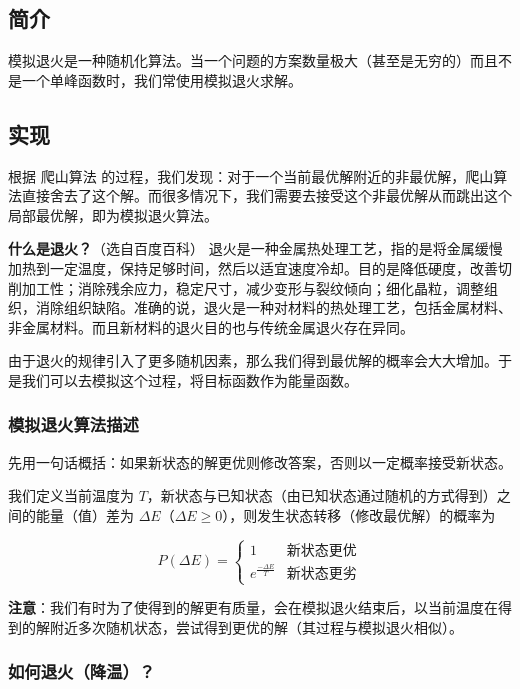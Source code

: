 
\subsection{简介}

模拟退火是一种随机化算法。当一个问题的方案数量极大（甚至是无穷的）而且不是一个单峰函数时，我们常使用模拟退火求解。

\hr

\subsection{实现}

根据  爬山算法  的过程，我们发现：对于一个当前最优解附近的非最优解，爬山算法直接舍去了这个解。而很多情况下，我们需要去接受这个非最优解从而跳出这个局部最优解，即为模拟退火算法。

\begin{QUOTE}{}{}
\textbf{什么是退火？}（选自百度百科）
退火是一种金属热处理工艺，指的是将金属缓慢加热到一定温度，保持足够时间，然后以适宜速度冷却。目的是降低硬度，改善切削加工性；消除残余应力，稳定尺寸，减少变形与裂纹倾向；细化晶粒，调整组织，消除组织缺陷。准确的说，退火是一种对材料的热处理工艺，包括金属材料、非金属材料。而且新材料的退火目的也与传统金属退火存在异同。
\end{QUOTE}

由于退火的规律引入了更多随机因素，那么我们得到最优解的概率会大大增加。于是我们可以去模拟这个过程，将目标函数作为能量函数。

\subsubsection{模拟退火算法描述}

先用一句话概括：如果新状态的解更优则修改答案，否则以一定概率接受新状态。

我们定义当前温度为 $T$，新状态与已知状态（由已知状态通过随机的方式得到）之间的能量（值）差为 $\Delta E$（$\Delta E\geqslant 0$），则发生状态转移（修改最优解）的概率为

$$
P(\Delta E)=
\begin{cases}
1&\text{新状态更优}\\
e^\frac{-\Delta E}{T}&\text{新状态更劣}
\end{cases}
$$

\textbf{注意}：我们有时为了使得到的解更有质量，会在模拟退火结束后，以当前温度在得到的解附近多次随机状态，尝试得到更优的解（其过程与模拟退火相似）。

\subsubsection{如何退火（降温）？}

